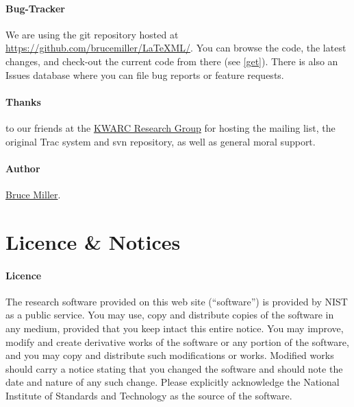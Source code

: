 \documentclass{article}
\begin{document}
\paragraph{Bug-Tracker}
We are using the git repository hosted at
\href{https://github.com/brucemiller/LaTeXML/}{https://github.com/brucemiller/LaTeXML/}.
You can browse the code, the latest changes, and check-out the current code from
there (see \ref{get}).  There is also an Issues database where you can
file bug reports or feature requests.



\paragraph{Thanks} to our friends at
the \href{http://kwarc.info}{KWARC Research Group}
for hosting the mailing list, the original Trac system and svn repository,
as well as general moral support.


\paragraph{Author} \href{mailto:bruce.miller@nist.gov}{Bruce Miller}.
\section{Licence \& Notices}\label{notices}

\paragraph{Licence}
The research software provided on this web site (``software'') is
provided by NIST as a public service. You may use, copy and distribute
copies of the software in any medium, provided that you keep intact
this entire notice. You may improve, modify and create derivative
works of the software or any portion of the software, and you may copy
and distribute such modifications or works. Modified works should
carry a notice stating that you changed the software and should note
the date and nature of any such change. Please explicitly acknowledge
the National Institute of Standards and Technology as the source of
the software.
\end{document}
